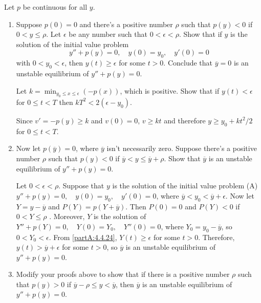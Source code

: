 \documentclass{ximera}
\begin{document}
\begin{problem}\label{exer:4.4.24}
Let $p$ be continuous for all $y$.
\begin{enumerate}
\item\label{partA:4.4.24} %
Suppose $p(0)=0$ and there's a positive number $\rho$ such that
$p(y)<0$ if  $0<y\le \rho$. Let $\epsilon$ be any
number such that
$0<\epsilon<\rho$.
Show that if $y$ is the solution of the initial value problem
$$
y''+p(y)=0,\quad y(0)=y_0,\quad y'(0)=0
$$
with $0<y_0<\epsilon$, then
$y(t)\ge\epsilon$ for some
$t>0$. Conclude that $\overline y=0$ is an unstable equilibrium of
$y''+p(y)=0$.
\begin{hint}
   Let $k=\min_{y_0\le
x\le\epsilon}\left(-p(x)\right)$,
which is positive. Show that if $y(t)<\epsilon$ for $0\le t<T$ then
$kT^2<2(\epsilon-y_0)$. 
\end{hint}

\begin{solution}
Since $v'=-p(y)\ge k$ and $v(0)=0$, $v\ge kt$ and therefore
$y\ge y_0+kt^2/2$ for $0\le t<T$.
\end{solution}

\item\label{partB:4.4.24} %
Now let $p(\overline y)=0$, where $\overline y$ isn't  necessarily
zero. Suppose there's a positive number $\rho$ such that
$p(y)<0$ if $\overline y<y\le \overline y+\rho$. Show that $\overline
y$ is an unstable equilibrium of $y''+p(y)=0$.

\begin{solution}
Let $0<\epsilon<\rho$.
Suppose that $y$ is the solution of the initial value problem
(A) $y''+p(y)=0,\quad y(0)=y_0,\quad y'(0)=0$, where $\overline
y<y_0<\overline y+\epsilon$. Now let $Y=y-\overline y$ and
$P(Y)=p(Y+\overline y)$. Then $P(0)=0$ and $P(Y)<0$ if
$0<Y\le\rho$ . Moreover, $Y$ is the solution of
 $Y''+p(Y)=0,\quad Y(0)=Y_0,\quad Y''(0)=0$, where $Y_0=y_0-\overline
y$, so $0<Y_0<\epsilon$. From \ref{partA:4.4.24}, $Y(t)\ge\epsilon$ for some
$t>0$. Therefore,$y(t)>\overline y+\epsilon$ for some $t>0$,
so $\overline y$ is an unstable equilibrium of $y''+p(y)=0$.
\end{solution}

\item %
Modify your proofs above to show that if there is a
positive number $\rho$ such that $p(y)>0$ if $\overline y-\rho\le y<\overline
y$, then $\overline y$ is an unstable equilibrium of $y''+p(y)=0$.
\end{enumerate}
\end{problem}
\end{document}

